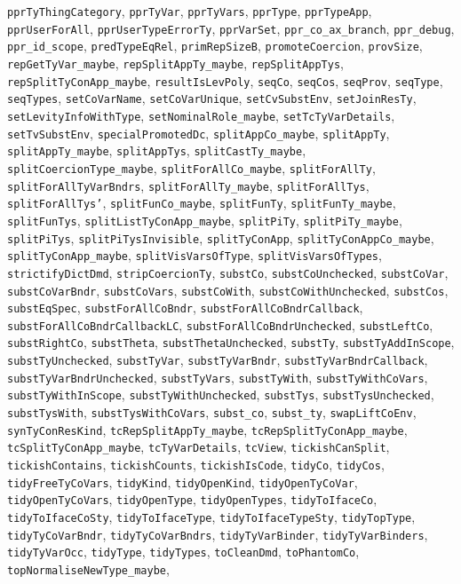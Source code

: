 \texttt{pprTyThingCategory}, \texttt{pprTyVar}, \texttt{pprTyVars}, \texttt{pprType}, \texttt{pprTypeApp}, \texttt{pprUserForAll}, \texttt{pprUserTypeErrorTy}, \texttt{pprVarSet}, \texttt{ppr_co_ax_branch}, \texttt{ppr_debug}, \texttt{ppr_id_scope}, \texttt{predTypeEqRel}, \texttt{primRepSizeB}, \texttt{promoteCoercion}, \texttt{provSize}, \texttt{repGetTyVar_maybe}, \texttt{repSplitAppTy_maybe}, \texttt{repSplitAppTys}, \texttt{repSplitTyConApp_maybe}, \texttt{resultIsLevPoly}, \texttt{seqCo}, \texttt{seqCos}, \texttt{seqProv}, \texttt{seqType}, \texttt{seqTypes}, \texttt{setCoVarName}, \texttt{setCoVarUnique}, \texttt{setCvSubstEnv}, \texttt{setJoinResTy}, \texttt{setLevityInfoWithType}, \texttt{setNominalRole_maybe}, \texttt{setTcTyVarDetails}, \texttt{setTvSubstEnv}, \texttt{specialPromotedDc}, \texttt{splitAppCo_maybe}, \texttt{splitAppTy}, \texttt{splitAppTy_maybe}, \texttt{splitAppTys}, \texttt{splitCastTy_maybe}, \texttt{splitCoercionType_maybe}, \texttt{splitForAllCo_maybe}, \texttt{splitForAllTy}, \texttt{splitForAllTyVarBndrs}, \texttt{splitForAllTy_maybe}, \texttt{splitForAllTys}, \texttt{splitForAllTys'}, \texttt{splitFunCo_maybe}, \texttt{splitFunTy}, \texttt{splitFunTy_maybe}, \texttt{splitFunTys}, \texttt{splitListTyConApp_maybe}, \texttt{splitPiTy}, \texttt{splitPiTy_maybe}, \texttt{splitPiTys}, \texttt{splitPiTysInvisible}, \texttt{splitTyConApp}, \texttt{splitTyConAppCo_maybe}, \texttt{splitTyConApp_maybe}, \texttt{splitVisVarsOfType}, \texttt{splitVisVarsOfTypes}, \texttt{strictifyDictDmd}, \texttt{stripCoercionTy}, \texttt{substCo}, \texttt{substCoUnchecked}, \texttt{substCoVar}, \texttt{substCoVarBndr}, \texttt{substCoVars}, \texttt{substCoWith}, \texttt{substCoWithUnchecked}, \texttt{substCos}, \texttt{substEqSpec}, \texttt{substForAllCoBndr}, \texttt{substForAllCoBndrCallback}, \texttt{substForAllCoBndrCallbackLC}, \texttt{substForAllCoBndrUnchecked}, \texttt{substLeftCo}, \texttt{substRightCo}, \texttt{substTheta}, \texttt{substThetaUnchecked}, \texttt{substTy}, \texttt{substTyAddInScope}, \texttt{substTyUnchecked}, \texttt{substTyVar}, \texttt{substTyVarBndr}, \texttt{substTyVarBndrCallback}, \texttt{substTyVarBndrUnchecked}, \texttt{substTyVars}, \texttt{substTyWith}, \texttt{substTyWithCoVars}, \texttt{substTyWithInScope}, \texttt{substTyWithUnchecked}, \texttt{substTys}, \texttt{substTysUnchecked}, \texttt{substTysWith}, \texttt{substTysWithCoVars}, \texttt{subst_co}, \texttt{subst_ty}, \texttt{swapLiftCoEnv}, \texttt{synTyConResKind}, \texttt{tcRepSplitAppTy_maybe}, \texttt{tcRepSplitTyConApp_maybe}, \texttt{tcSplitTyConApp_maybe}, \texttt{tcTyVarDetails}, \texttt{tcView}, \texttt{tickishCanSplit}, \texttt{tickishContains}, \texttt{tickishCounts}, \texttt{tickishIsCode}, \texttt{tidyCo}, \texttt{tidyCos}, \texttt{tidyFreeTyCoVars}, \texttt{tidyKind}, \texttt{tidyOpenKind}, \texttt{tidyOpenTyCoVar}, \texttt{tidyOpenTyCoVars}, \texttt{tidyOpenType}, \texttt{tidyOpenTypes}, \texttt{tidyToIfaceCo}, \texttt{tidyToIfaceCoSty}, \texttt{tidyToIfaceType}, \texttt{tidyToIfaceTypeSty}, \texttt{tidyTopType}, \texttt{tidyTyCoVarBndr}, \texttt{tidyTyCoVarBndrs}, \texttt{tidyTyVarBinder}, \texttt{tidyTyVarBinders}, \texttt{tidyTyVarOcc}, \texttt{tidyType}, \texttt{tidyTypes}, \texttt{toCleanDmd}, \texttt{toPhantomCo}, \texttt{topNormaliseNewType_maybe}, 